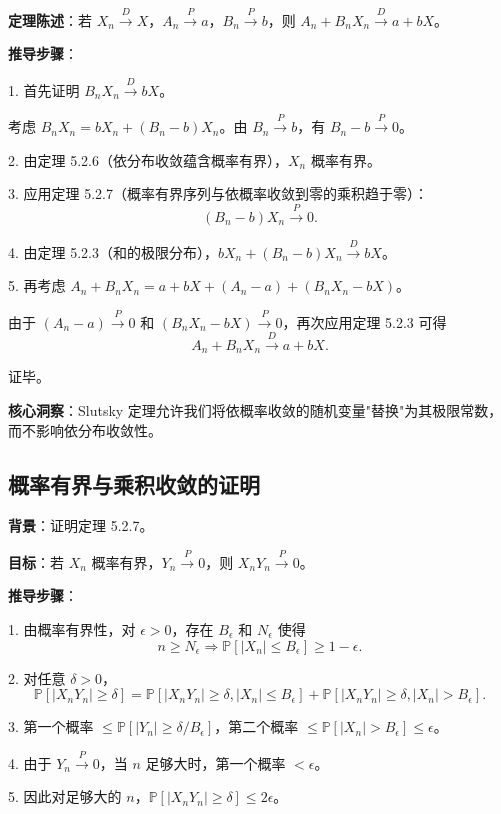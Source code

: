 \textbf{定理陈述}：若 $X_n \xrightarrow{D} X$，$A_n \xrightarrow{P} a$，$B_n \xrightarrow{P} b$，则 $A_n + B_n X_n \xrightarrow{D} a + bX$。

\textbf{推导步骤}：

1. 首先证明 $B_n X_n \xrightarrow{D} bX$。

考虑 $B_n X_n = bX_n + (B_n - b)X_n$。由 $B_n \xrightarrow{P} b$，有 $B_n - b \xrightarrow{P} 0$。

2. 由定理 5.2.6（依分布收敛蕴含概率有界），${X_n}$ 概率有界。

3. 应用定理 5.2.7（概率有界序列与依概率收敛到零的乘积趋于零）：
\[
(B_n - b)X_n \xrightarrow{P} 0.
\]

4. 由定理 5.2.3（和的极限分布），$bX_n + (B_n - b)X_n \xrightarrow{D} bX$。

5. 再考虑 $A_n + B_n X_n = a + bX + (A_n - a) + (B_n X_n - bX)$。

由于 $(A_n - a) \xrightarrow{P} 0$ 和 $(B_n X_n - bX) \xrightarrow{P} 0$，再次应用定理 5.2.3 可得
\[
A_n + B_n X_n \xrightarrow{D} a + bX.
\]

证毕。

\textbf{核心洞察}：Slutsky 定理允许我们将依概率收敛的随机变量"替换"为其极限常数，而不影响依分布收敛性。

\subsection{概率有界与乘积收敛的证明}\label{sec:product-convergence-proof}

\textbf{背景}：证明定理 5.2.7。

\textbf{目标}：若 ${X_n}$ 概率有界，$Y_n \xrightarrow{P} 0$，则 $X_n Y_n \xrightarrow{P} 0$。

\textbf{推导步骤}：

1. 由概率有界性，对 $\epsilon > 0$，存在 $B_\epsilon$ 和 $N_\epsilon$ 使得
\[
n \geq N_\epsilon \Rightarrow \mathbb{P}[|X_n| \leq B_\epsilon] \geq 1 - \epsilon.
\]

2. 对任意 $\delta > 0$，
\[
\mathbb{P}[|X_n Y_n| \geq \delta] = \mathbb{P}[|X_n Y_n| \geq \delta, |X_n| \leq B_\epsilon] + \mathbb{P}[|X_n Y_n| \geq \delta, |X_n| > B_\epsilon].
\]

3. 第一个概率 $\leq \mathbb{P}[|Y_n| \geq \delta/B_\epsilon]$，第二个概率 $\leq \mathbb{P}[|X_n| > B_\epsilon] \leq \epsilon$。

4. 由于 $Y_n \xrightarrow{P} 0$，当 $n$ 足够大时，第一个概率 $< \epsilon$。

5. 因此对足够大的 $n$，$\mathbb{P}[|X_n Y_n| \geq \delta] \leq 2\epsilon$。

